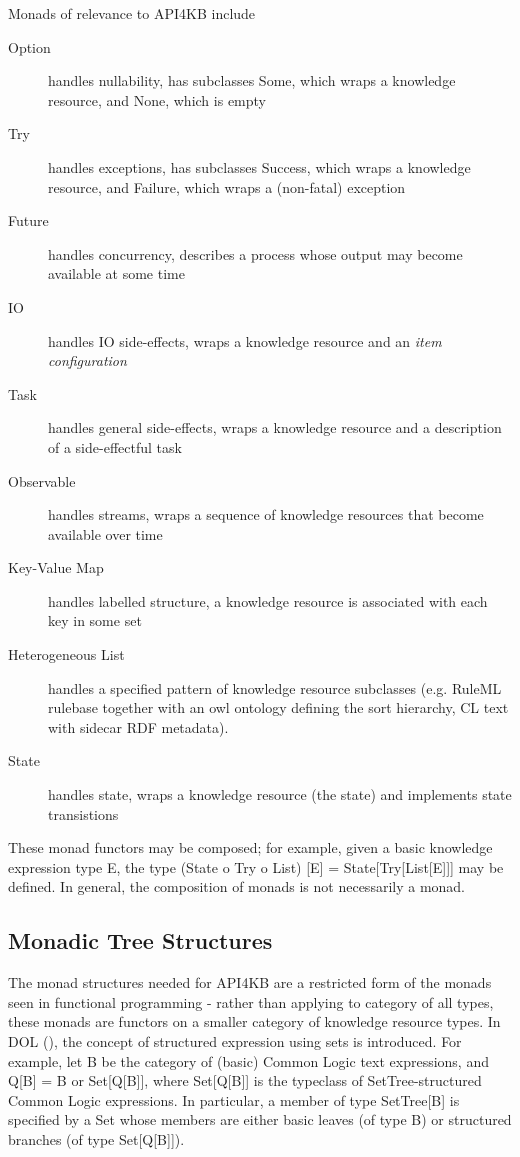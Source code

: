 \documentclass[runningheads]{llncs}
\begin{document}
Monads of relevance to API4KB include
\begin{description}
\item [Option] handles nullability, has subclasses Some, which wraps a knowledge resource, and None, which is empty
\item [Try] handles exceptions, has subclasses Success, which wraps a knowledge resource, and Failure, which wraps a (non-fatal) exception
\item [Future] handles concurrency, describes a process whose output may become available at some time
\item [IO] handles IO side-effects, wraps a knowledge resource and an \emph{item configuration}
\item [Task] handles general side-effects, wraps a knowledge resource and a description of a side-effectful task
\item [Observable] handles streams, wraps a sequence of knowledge resources that become available over time
\item [Key-Value Map] handles labelled structure, a knowledge resource is associated with each key in some set
\item [Heterogeneous List] handles a specified pattern of knowledge resource subclasses (e.g. RuleML rulebase together with an owl ontology defining the sort hierarchy, CL text with sidecar RDF metadata).
\item [State] handles state, wraps a knowledge resource (the state) and implements state transistions
\end{description}
These monad functors may be composed; for example, given a basic knowledge expression type E, the type (State o Try o List) [E] = State[Try[List[E]]] may be defined.
In general, the composition of monads is not necessarily a monad. 



\subsection{Monadic Tree Structures}
The monad structures needed for API4KB are a restricted form of the monads seen in functional programming - rather than applying to category of all types, these monads are functors on a smaller category of knowledge resource types. In DOL (), the concept of structured expression using sets is introduced. For example, let B be the category of (basic) Common Logic text expressions, and Q[B] = B or Set[Q[B]], where Set[Q[B]] is the typeclass of SetTree-structured Common Logic expressions. In particular, a member of type SetTree[B] is specified by a Set whose members are either  basic leaves (of type B) or structured branches (of type Set[Q[B]]). 
\end{document}
